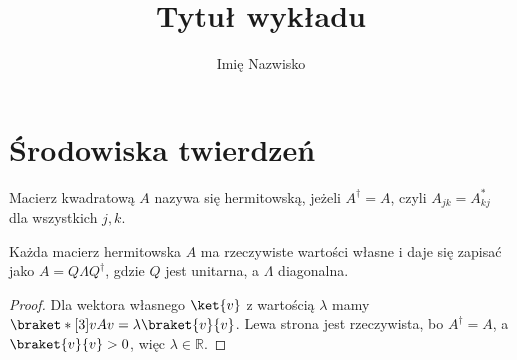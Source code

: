 \documentclass[a4paper, polish, 11pt]{scrartcl}
\title{Tytuł wykładu}
\author{Imię Nazwisko}
\date{}
\begin{document}
\maketitle

\begincolumns

\section{Środowiska twierdzeń}\label{sec:srodowiska}

\begin{definition}\label{def:hermit}
Macierz kwadratową $A$ nazywa się hermitowską, jeżeli $A^\dagger = A$, czyli $A_{jk} = A_{kj}^*$ dla wszystkich $j, k$.
\end{definition}

\begin{theorem}\label{tw:spektralne}
Każda macierz hermitowska $A$ ma rzeczywiste wartości własne i daje się zapisać jako $A = Q\Lambda Q^\dagger$, gdzie $Q$ jest unitarna, a $\Lambda$ diagonalna.
\end{theorem}

\begin{proof}
Dla wektora własnego $\ket{v}$ z wartością $\lambda$ mamy $\braket*[3]{v}{A}{v} = \lambda\braket{v}{v}$. Lewa strona jest rzeczywista, bo $A^\dagger = A$, a $\braket{v}{v} > 0$, więc $\lambda \in \mathbb{R}$.
\end{proof}
\end{document}
